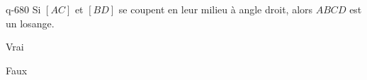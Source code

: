 \begin{truefalse}{q-680}
Si $[AC]$ et $[BD]$ se coupent en leur milieu à angle droit, alors $ABCD$ est un losange.
\item* Vrai
\item Faux
\end{truefalse}

